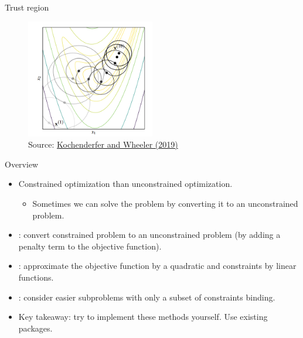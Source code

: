 \documentclass[11pt,xcolor={dvipsnames},aspectratio=159,hyperref={pdftex,pdfpagemode=UseNone,hidelinks,pdfdisplaydoctitle=true},usepdftitle=false]{beamer}
\begin{document}
        \begin{frame}{Trust region}
            \centering
            \begin{figure}
    
            \includegraphics[width=0.50\textwidth]{trustregion.png}
            \caption{Source: \href{https://mitpress.mit.edu/9780262039420/}{Kochenderfer and Wheeler (2019)}}
            \end{figure}
    
        \end{frame}  

        \begin{frame}
        \end{frame}

        \begin{frame}{Overview}
            \begin{itemize}
                \item Constrained optimization  than unconstrained optimization.
                \begin{itemize}
                    \item Sometimes we can solve the problem by converting it to an unconstrained problem.
                \end{itemize}
                \item {}: convert constrained problem to an unconstrained problem (by adding a penalty term to the objective function).
                \item {}: approximate the objective function by a quadratic and constraints by linear functions.
                \item {}: consider easier subproblems with only a subset of constraints binding.
                \item Key takeaway:  try to implement these methods yourself. Use existing packages.
                \end{itemize}
            \end{frame}   
\end{document}
